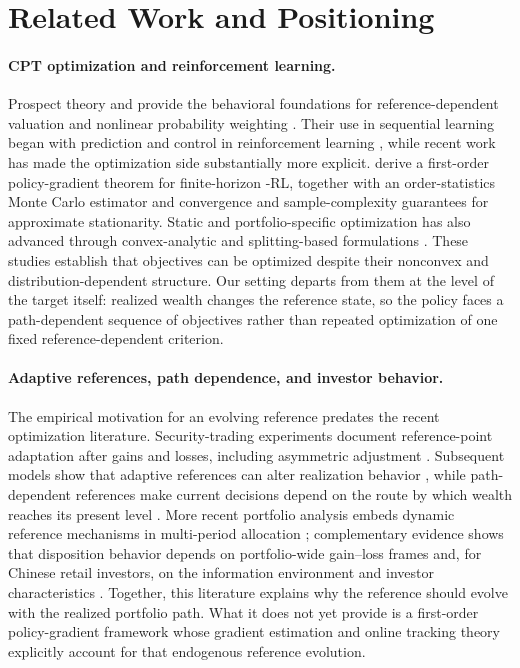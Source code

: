 \section{Related Work and Positioning}\label{sec:related}

\paragraph{CPT optimization and reinforcement learning.}
Prospect theory and \CPT provide the behavioral foundations for reference-dependent valuation and nonlinear probability weighting \citep{kahneman1979prospect,tversky1992advances}.  Their use in sequential learning began with \CPT prediction and control in reinforcement learning \citep{prashanth2016cumulative}, while recent work has made the optimization side substantially more explicit.  \citet{lepel2026policygradients} derive a first-order policy-gradient theorem for finite-horizon \CPT-RL, together with an order-statistics Monte Carlo estimator and convergence and sample-complexity guarantees for approximate stationarity.  Static and portfolio-specific \CPT optimization has also advanced through convex-analytic and splitting-based formulations \citep{luxenberg2024portfolio,cui2025decision,wu2026behavioral}.  These studies establish that \CPT objectives can be optimized despite their nonconvex and distribution-dependent structure.  Our setting departs from them at the level of the target itself: realized wealth changes the reference state, so the policy faces a path-dependent sequence of \CPT objectives rather than repeated optimization of one fixed reference-dependent criterion.

\paragraph{Adaptive references, path dependence, and investor behavior.}
The empirical motivation for an evolving reference predates the recent optimization literature.  Security-trading experiments document reference-point adaptation after gains and losses, including asymmetric adjustment \citep{arkes2008reference}.  Subsequent models show that adaptive references can alter realization behavior \citep{he2019realization}, while path-dependent references make current decisions depend on the route by which wealth reaches its present level \citep{qin2022realization}.  More recent portfolio analysis embeds dynamic reference mechanisms in multi-period allocation \citep{gao2024multiperiod}; complementary evidence shows that disposition behavior depends on portfolio-wide gain--loss frames \citep{an2024portfolio} and, for Chinese retail investors, on the information environment and investor characteristics \citep{chen2025xueqiu}.  Together, this literature explains why the reference should evolve with the realized portfolio path.  What it does not yet provide is a first-order \CPT policy-gradient framework whose gradient estimation and online tracking theory explicitly account for that endogenous reference evolution.


